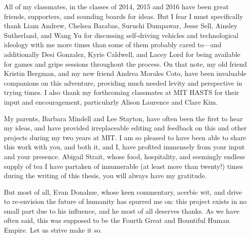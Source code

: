 All of my classmates, in the classes of 2014, 2015 and 2016 have been great
friends, supporters, and sounding boards for ideas. But I fear I must
specifically thank Liam Andrew, Chelsea Barabas, Suruchi Dumpawar,
Jesse Sell, Ainsley Sutherland, and Wang Yu for discussing
self-driving vehicles and technological ideology with me 
more times than some of them probably cared to---and additionally Desi
Gonzalez, Kyrie Caldwell, and Lacey Lord for being available for
games and gripe sessions throughout the process. On that note, my old
friend Kristin Bergman, and my new friend Andrea Morales Coto, have
been invaluable companions on this adventure, providing much needed
levity and perspective in trying times. I also thank my forthcoming
classmates at MIT HASTS for their input and encouragement,
particularly Alison Laurence and Clare Kim.

My parents, Barbara Mindell and Lee Stayton, have often been the first
to hear my ideas, and have provided irreplaceable editing and feedback
on this and other projects during my two years at MIT. I am so pleased
to have been able to share this work with you, and both it, and I,
have profited immensely from your input and your presence. Abigail
Strait, whose food, hospitality, and seemingly endless supply of tea I have
partaken of innumerable (at least more than twenty!) times during the
writing of this thesis, you will always have my gratitude.

But most of all, Evan Donahue, whose keen commentary, acerbic wit, and
drive to re-envision the future of humanity has spurred me on: this
project exists in no small part due to his influence, and he most of
all deserves thanks. As we have 
often said, this was supposed to be the Fourth Great and Bountiful
Human Empire. Let us strive make it so.

 

